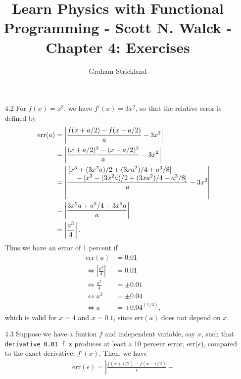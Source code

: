\documentclass{article}
\title{Learn Physics with Functional Programming - Scott N. Walck - Chapter 4: Exercises}
\author{Graham Strickland}
\begin{document}
\maketitle  

\begin{itemize}
    \item[4.2]
    For $f(x) = x^3$, we have $f'(x) = 3x^2$, so that the relative error is defined by
    \begin{equation*}
        \begin{split}
            \text{err}(a) &= \left| \frac{f(x + a/2) - f(x - a/2)}{a} - 3x^2 \right| \\
            &= \left| \frac{(x + a/2)^3 - (x - a/2)^3}{a} - 3x^2 \right| \\
            &= \left| \frac{\splitfrac{[x^3 + (3x^2a)/2 + (3xa^2)/4 + a^3/8]}
                {{} - [x^3 - (3x^2a)/2 + (3xa^2)/4 - a^3/8]}}{a} - 3x^2 \right| \\
            &= \left| \frac{3x^2a + a^3/4 - 3x^2a}{a} \right| \\
            &= \left| \frac{a^3}{4} \right|. %
        \end{split}
    \end{equation*}
    \qquad Thus we have an error of 1 percent if 
    \begin{equation*}
        \begin{split}
            \text{err}(a) &= 0.01 \\
            \Leftrightarrow \left|\frac{a^3}{4}\right| &= 0.01 \\
            \Leftrightarrow \frac{a^3}{4} &= \pm 0.01 \\
            \Leftrightarrow a^3 &= \pm 0.04 \\
            \Leftrightarrow a &= \pm {0.04}^{(1/3)},
        \end{split}
    \end{equation*}
    which is valid for $x = 4$ and $x = 0.1$, since $\text{err}(a)$ does not depend on $x$.
    \item[4.3]  %
    Suppose we have a funtion $f$ and independent variable, say $x$, such that 
    \verb|derivative 0.01 f x| produces at least a 10 percent error, err($\epsilon$), compared to 
    the exact derivative, $f'(x)$. Then, we have
    \begin{equation*}
        \begin{split}
            \text{err}(\epsilon) = \left| \frac{f(x + \epsilon/2) - f(x - \epsilon/2)}{\epsilon} - 

\end{split}
\end{equation*}
\end{itemize}
\end{document}
